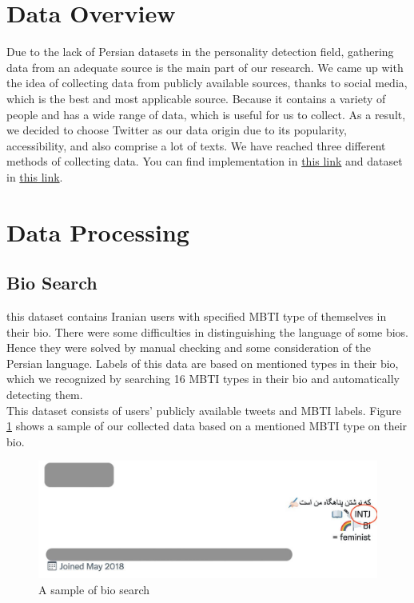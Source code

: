 \documentclass[10pt, a4paper]{article}
\begin{document}
\newpage
\section{Data Overview}
Due to the lack of Persian datasets in the personality detection
field, gathering data from an adequate source is the main part of
our research. We came up with the idea of collecting data from
publicly available sources, thanks to social media, which is the best
and most applicable source. Because it contains a variety of people
and has a wide range of data, which is useful for us to collect. As a
result, we decided to choose Twitter as our data origin due to its
popularity, accessibility, and also comprise a lot of texts. We have
reached three different methods of collecting data. You can find implementation in \href{https://github.com/mjavadmt/PersonalityDetection}{this link} and
dataset in \href{https://huggingface.co/datasets/mjavadmt/mbti-persian-twitter}{this link}.

\section{Data Processing}

\subsection{Bio Search}

this dataset contains Iranian users with specified MBTI type of themselves in their bio.
There were some difficulties in distinguishing the language of some bios.
Hence they were solved by manual checking and some consideration of the Persian language.
Labels of this data are based on mentioned types in their bio, which we recognized by searching 16 MBTI types in their bio and automatically detecting them.
\\
This dataset consists of users' publicly available tweets and MBTI labels.
Figure \ref{bio_figure} shows a sample of our collected data based on a mentioned MBTI type on their bio.
\begin{figure}[h]
    \centering
    \includegraphics[width=.95\columnwidth]{images/sample.jpg}
    \caption{A sample of bio search}
    \label{bio_figure}
\end{figure}
\end{document}
